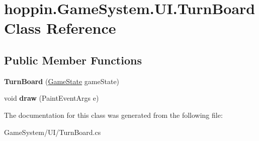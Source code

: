 \hypertarget{classhoppin_1_1_game_system_1_1_u_i_1_1_turn_board}{}\section{hoppin.\+Game\+System.\+U\+I.\+Turn\+Board Class Reference}
\label{classhoppin_1_1_game_system_1_1_u_i_1_1_turn_board}
\subsection*{Public Member Functions}
\begin{DoxyCompactItemize}
\item 
{\bfseries Turn\+Board} (\hyperlink{classhoppin_1_1_game_system_1_1_game_state}{Game\+State} game\+State)\hypertarget{classhoppin_1_1_game_system_1_1_u_i_1_1_turn_board_ab2b58b1021674a41a378cc31538a066e}{}\label{classhoppin_1_1_game_system_1_1_u_i_1_1_turn_board_ab2b58b1021674a41a378cc31538a066e}

\item 
void {\bfseries draw} (Paint\+Event\+Args e)\hypertarget{classhoppin_1_1_game_system_1_1_u_i_1_1_turn_board_ad0a4585b0066bffe35ec3c8652a4cfe5}{}\label{classhoppin_1_1_game_system_1_1_u_i_1_1_turn_board_ad0a4585b0066bffe35ec3c8652a4cfe5}

\end{DoxyCompactItemize}


The documentation for this class was generated from the following file\+:\begin{DoxyCompactItemize}
\item 
Game\+System/\+U\+I/Turn\+Board.\+cs\end{DoxyCompactItemize}
